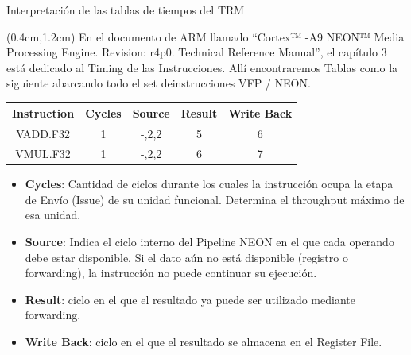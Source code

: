 \begin{frame}{Interpretación de las tablas de tiempos del TRM}
 \begin{textblock*}{\textwidth}(0.4cm,1.2cm)
  \justifying En el documento de ARM llamado ``Cortex™ -A9 NEON™ Media Processing Engine. Revision: r4p0. Technical Reference Manual'', el capítulo 3 está dedicado al Timing de las Instrucciones. Allí encontraremos Tablas como la siguiente abarcando todo el set deinstrucciones VFP / NEON.
  \begin{center}
   \small
   \begin{tabular}{|c|c|c|c|c|}
    \hline
    Instruction & Cycles & Source & Result & Write Back \\
    \hline
    VADD.F32 & 1 & -,2,2 & 5 & 6 \\
    VMUL.F32 & 1 & -,2,2 & 6 & 7 \\
    \hline
   \end{tabular}
  \end{center}
  \begin{itemize}[<+(1)->]\justifying
   \item \textbf{Cycles}: Cantidad de ciclos durante los cuales la instrucción ocupa la etapa de Envío (Issue) de su unidad funcional. Determina el throughput máximo de esa unidad.
   \item \textbf{Source}: Indica el ciclo interno del Pipeline NEON en el que cada operando debe estar disponible. Si el dato aún no está disponible (registro o forwarding), la instrucción no puede continuar su ejecución.
   \item \textbf{Result}: ciclo en el que el resultado ya puede ser utilizado mediante forwarding.
   \item \textbf{Write Back}: ciclo en el que el resultado se almacena en el Register File.
  \end{itemize}
 \end{textblock*}
\end{frame}

